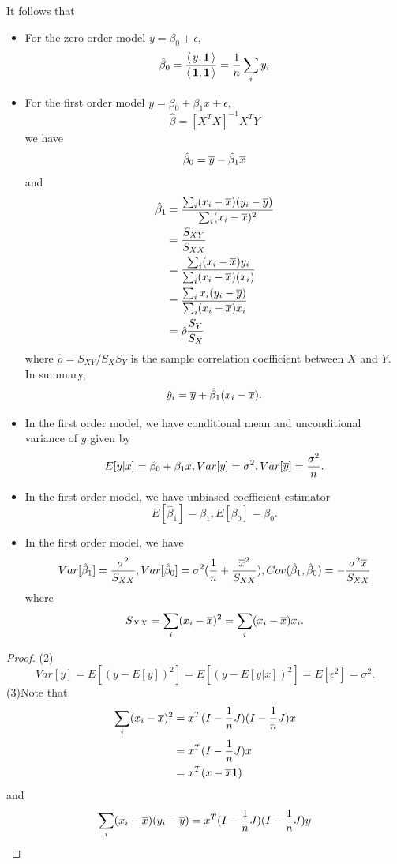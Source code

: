 \begin{refsection}
\begin{corollary}
It follows that
	\begin{itemize}
		\item For the zero order model $y = \beta_0 + \epsilon$, $$\hat{\beta}_0 = \frac{{\left< \, y,\bm{1} \, \right>}}{{\left< \, \bm{1},\bm{1} \, \right>}} = \frac{1}{n}\sum_i y_i$$
		\item For the first order model $y = \beta_0 +\beta_1 x+ \epsilon$, $$\hat{\beta} = [X^TX]^{-1}X^TY$$
		we have $$\hat{\beta}_0 = \overline{y} - \hat{\beta}_1\overline{x}$$ and
		\begin{align*}
		\hat{\beta}_1 &= \frac{\sum_i (x_{i}-\overline{x})(y_i - \overline{y})}{\sum_i (x_{i}-\overline{x})^2} \\
		& = \frac{S_{XY}}{S_{XX}} \\
		& = \frac{\sum_i (x_{i}-\overline{x})y_i }{\sum_i (x_{i}-\overline{x})(x_i)} \\
		& = \frac{\sum_i x_{i}(y_i - \overline{y})}{\sum_i (x_{i}-\overline{x})x_i} \\
		& = \hat{\rho} \frac{S_Y}{S_X}
		\end{align*}
	where $\hat{\rho} = S_{XY}/S_XS_Y$ is the sample correlation coefficient between $X$ and $Y$.	
		In summary, $$\hat{y}_i = \overline{y} + \hat{\beta}_1(x_i - \overline{x}).$$
		\item In the first order model, we have conditional mean and  unconditional variance of $y$ given by
		$$E[y|x] = \beta_0+\beta_1x, Var[y] = \sigma^2, Var[\overline{y}]=\frac{\sigma^2}{n}.$$
		\item In the first order model, we have unbiased coefficient estimator
		$$E[\hat{\beta}_1] = \beta_1, E[\beta_0] = \beta_0.$$
		\item In the first order model, we have 
		$$Var[\hat{\beta}_1] = \frac{\sigma^2}{S_{XX}}, Var[\hat{\beta}_0] = \sigma^2(\frac{1}{n} + \frac{\overline{x}^2}{S_{XX}}),Cov(\hat{\beta}_1,\hat{\beta}_0) = -\frac{\sigma^2\overline{x}}{S_{XX}}$$
		where
		$$S_{XX} = \sum_i (x_{i}-\overline{x})^2=\sum_i (x_{i}-\overline{x})x_i.$$
	\end{itemize}
\end{corollary}
\begin{proof}
(2)
$$Var[y] = E[(y-E[y])^2] = E[(y-E[y|x])^2] = E[\epsilon^2] = \sigma^2.$$	
(3)Note that 
\begin{align*}
\sum_i (x_{i}-\overline{x})^2 &= x^T(I-\frac{1}{n}J)(I-\frac{1}{n}J)x \\
&= x^T(I-\frac{1}{n}J)x \\
&= x^T(x-\overline{x}\bm{1}) 
\end{align*}
and
\begin{align*}
\sum_i (x_{i}-\mean{x})(y_i - \mean{y}) &= x^T(I-\frac{1}{n}J)(I-\frac{1}{n}J)y \\

\end{align*}
\end{proof}
\end{refsection}
